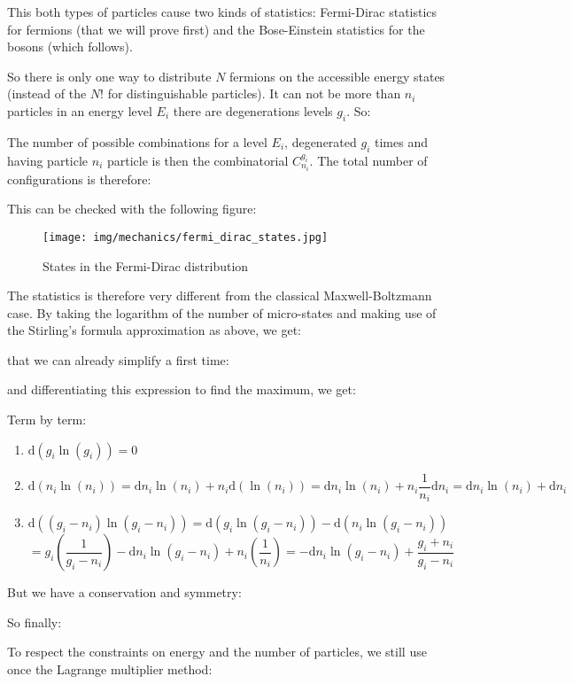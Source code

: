 	This both types of particles cause two kinds of statistics: Fermi-Dirac statistics for fermions (that we will prove first) and the Bose-Einstein statistics for the bosons (which follows). 

	So there is only one way to distribute $N$ fermions on the accessible energy states (instead of the $N!$ for distinguishable particles). It can not be more than $n_i$ particles in an energy level $E_i$ there are degenerations levels $g_i$. So:
	
	The number of possible combinations for a level $E_i$, degenerated $g_i$ times and having particle $n_i$ particle is then the combinatorial $C_{n_i}^{g_i}$. The total number of configurations is therefore:
	
	This can be checked with the following figure:
	\begin{figure}[H]
		\centering
		\texttt{[image: img/mechanics/fermi\_dirac\_states.jpg]}
		\caption{States in the Fermi-Dirac distribution}
	\end{figure}
	 The statistics is therefore very different from the classical Maxwell-Boltzmann case. By taking the logarithm of the number of micro-states and making use of the Stirling's formula approximation  as above, we get:
	 
	that we can already simplify a first time:
	
	and differentiating this expression to find the maximum, we get:
	
	Term by term:
	\begin{enumerate}
		\item $\mathrm{d}(g_i\ln(g_i))=0$

		\item $\mathrm{d}(n_i\ln(n_i))=\mathrm{d}n_i\ln(n_i)+n_i\mathrm{d}(\ln(n_i))=\mathrm{d}n_i\ln(n_i)+n_i\dfrac{1}{n_i}\mathrm{d}n_i=\mathrm{d}n_i\ln(n_i)+\mathrm{d}n_i$

		\item $\mathrm{d}((g_i-n_i)\ln(g_i-n_i))=\mathrm{d}(g_i\ln(g_i-n_i))-\mathrm{d}(n_i\ln(g_i-n_i))$\\
				$=g_i\left(\dfrac{1}{g_i-n_i}\right)-\mathrm{d}n_i\ln(g_i-n_i)+n_i\left(\dfrac{1}{n_i}\right)=-\mathrm{d}n_i\ln(g_i-n_i)+\dfrac{g_i+n_i}{g_i-n_i}$
	\end{enumerate}
	But we have a conservation and symmetry:
	
	So finally:
	
	To respect the constraints on energy and the number of particles, we still use once the Lagrange multiplier method:
	
